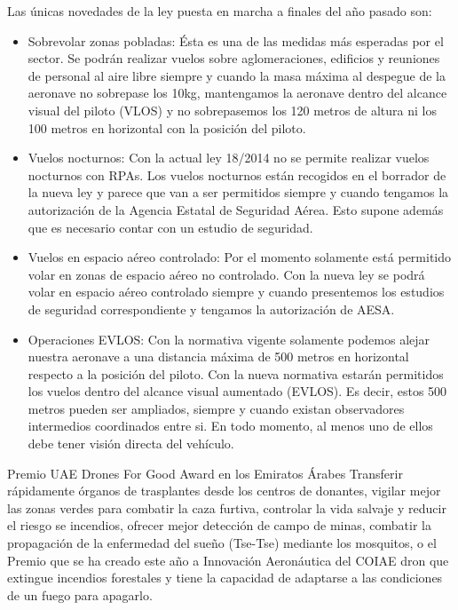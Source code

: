 \begin{itemize}
	\end{itemize}
	
\hspace{-1cm} Las únicas novedades de la ley puesta en marcha a finales del año pasado son:

	\begin{itemize}
		\item Sobrevolar zonas pobladas: Ésta es una de las medidas más esperadas por el sector. Se podrán realizar vuelos sobre aglomeraciones, edificios y reuniones de personal al aire libre siempre y cuando la masa máxima al despegue de la aeronave no sobrepase los 10kg, mantengamos la aeronave dentro del alcance visual del piloto (VLOS) y no sobrepasemos los 120 metros de altura ni los 100 metros en horizontal con la posición del piloto.
		\item Vuelos nocturnos: Con la actual ley 18/2014 no se permite realizar vuelos nocturnos con RPAs. Los vuelos nocturnos están recogidos en el borrador de la nueva ley y parece que van a ser permitidos siempre y cuando tengamos la autorización de la Agencia Estatal de Seguridad Aérea. Esto supone además que es necesario contar con un estudio de seguridad.
		\item Vuelos en espacio aéreo controlado: Por el momento solamente está permitido volar en zonas de espacio aéreo no controlado. Con la nueva ley se podrá volar en espacio aéreo controlado siempre y cuando presentemos los estudios de seguridad correspondiente y tengamos la autorización de AESA.
		\item Operaciones EVLOS: Con la normativa vigente solamente podemos alejar nuestra aeronave a una distancia máxima de 500 metros en horizontal respecto a la posición del piloto. Con la nueva normativa estarán permitidos los vuelos dentro del alcance visual aumentado (EVLOS). Es decir, estos 500 metros pueden ser ampliados, siempre y cuando existan observadores intermedios coordinados entre si. En todo momento, al menos uno de ellos debe tener visión directa del vehículo.
	\end{itemize}	 

\hspace{1cm} Premio UAE Drones For Good Award en los Emiratos Árabes Transferir rápidamente órganos de trasplantes desde los centros de donantes, vigilar mejor las zonas verdes para combatir la caza furtiva, controlar la vida salvaje y reducir el riesgo se incendios, ofrecer mejor detección de campo de minas, combatir la propagación de la enfermedad del sueño (Tse-Tse) mediante los mosquitos, o el Premio que se ha creado este año a Innovación Aeronáutica del COIAE dron que extingue incendios forestales y tiene la capacidad de adaptarse a las condiciones de un fuego para apagarlo.

